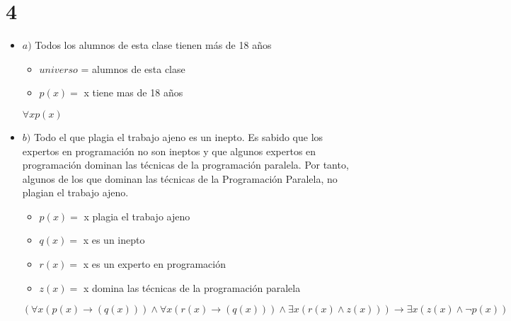 \documentclass[12pt, fleqn]{article}                            %
\theoremstyle{break}                                            %
\newcommand \lLongTo {\longrightarrow}                          %
\begin{document}
\clearpage
\section{4}


    \begin{itemize}
        \item $a)$
            Todos los alumnos de esta clase tienen más de 18 años

           \begin{itemize}
               \item $universo$ = alumnos de esta clase
               \item $p(x) = $ x tiene mas de 18 años
           \end{itemize}

           $\forall x p(x)$

        \item $b)$
            Todo el que plagia el trabajo ajeno es un inepto. Es sabido que los
            expertos en programación no son ineptos 
            y 
            que algunos expertos en
            programación dominan las técnicas de la programación paralela. Por
            tanto, algunos de los que dominan las técnicas de la Programación
            Paralela, no plagian el trabajo ajeno.

           \begin{itemize}
               \item $p(x) = $ x plagia el trabajo ajeno
               \item $q(x) = $ x es un inepto
               \item $r(x) = $ x es un experto en programación
               \item $z(x) = $ x domina las técnicas de la programación paralela
           \end{itemize}

            $
            (
                \forall x (
                    p(x) \lLongTo (
                        q(x)
                    )
                )
                \wedge
                \forall x (
                    r(x) \lLongTo (
                        q(x)
                    )
                )
                \wedge
                \exists x (
                    r(x) \wedge z(x)
                )
            )
            \lLongTo
            \exists x (
                z(x) \wedge \neg p(x)
            )
            $


\end{itemize}
\end{document}
